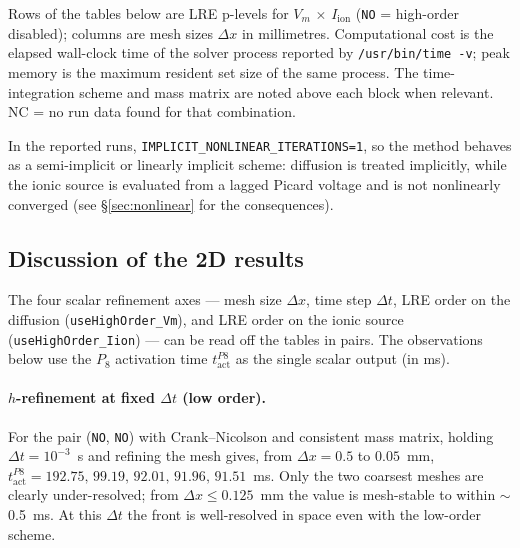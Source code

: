 \documentclass[11pt,a4paper]{article}
\newcommand{\Vm}{V_{m}}
\newcommand{\Iion}{I_{\text{ion}}}
\newcommand{\code}[1]{\texttt{\small #1}}
\begin{document}
Rows of the tables below are LRE p-levels for $\Vm$ $\times$ $\Iion$
(\texttt{NO} = high-order disabled); columns are mesh sizes
$\Delta x$ in millimetres. Computational cost is the elapsed wall-clock
time of the solver process reported by \texttt{/usr/bin/time -v}; peak
memory is the maximum resident set size of the same process. The
time-integration scheme and mass matrix are noted above each block when
relevant. \textsc{NC} = no run data found for
that combination.

In the reported runs, \code{IMPLICIT\_NONLINEAR\_ITERATIONS=1}, so the
method behaves as a semi-implicit or linearly implicit scheme:
diffusion is treated implicitly, while the ionic source is evaluated
from a lagged Picard voltage and is not nonlinearly converged
(see \S\ref{sec:nonlinear} for the consequences).



\subsection{Discussion of the 2D results}
\label{sec:results:discussion}

The four scalar refinement axes --- mesh size $\Delta x$, time step
$\Delta t$, LRE order on the diffusion (\code{useHighOrder\_Vm}), and
LRE order on the ionic source (\code{useHighOrder\_Iion}) --- can be
read off the tables in pairs. The observations below use the
$P_{8}$ activation time $t_{\text{act}}^{P8}$ as the single scalar
output (in ms).

\paragraph{$h$-refinement at fixed $\Delta t$ (low order).}
For the pair (\code{NO}, \code{NO}) with Crank--Nicolson and
consistent mass matrix, holding $\Delta t = 10^{-3}$~s and refining
the mesh gives, from $\Delta x = 0.5$ to $0.05$~mm,
$t_{\text{act}}^{P8} = 192.75,\, 99.19,\, 92.01,\, 91.96,\, 91.51$~ms.
Only the two coarsest meshes are clearly under-resolved; from
$\Delta x \le 0.125$~mm the value is mesh-stable to within $\sim$0.5~ms.
At this $\Delta t$ the front is well-resolved in space even with the
low-order scheme.
\end{document}
